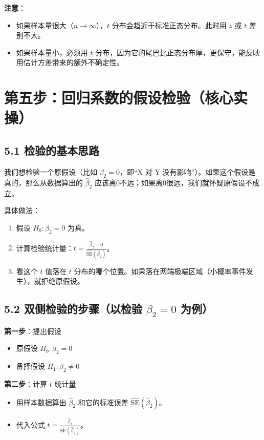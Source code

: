 \documentclass[12pt,a4paper]{ctexart}
\begin{document}
\textbf{注意}：
\begin{itemize}
    \item 如果样本量很大（\(n \to \infty\)），\(t\) 分布会趋近于标准正态分布。此时用 \(z\) 或 \(t\) 差别不大。
    \item 如果样本量小，必须用 \(t\) 分布，因为它的尾巴比正态分布厚，更保守，能反映用估计方差带来的额外不确定性。
\end{itemize}

\section*{第五步：回归系数的假设检验（核心实操）}

\subsection*{5.1 检验的基本思路}
我们想检验一个原假设（比如 \(\beta_2 = 0\)，即“X 对 Y 没有影响”）。如果这个假设是真的，那么从数据算出的 \(\hat{\beta}_2\) 应该离0不远；如果离0很远，我们就怀疑原假设不成立。

具体做法：
\begin{enumerate}
    \item 假设 \(H_0: \beta_2 = 0\) 为真。
    \item 计算检验统计量：\(t = \frac{\hat{\beta}_2 - 0}{\widehat{\text{SE}}(\hat{\beta}_2)}\)。
    \item 看这个 \(t\) 值落在 \(t\) 分布的哪个位置。如果落在两端极端区域（小概率事件发生），就拒绝原假设。
\end{enumerate}

\subsection*{5.2 双侧检验的步骤（以检验 \(\beta_2 = 0\) 为例）}
\textbf{第一步}：提出假设
\begin{itemize}
    \item 原假设 \(H_0: \beta_2 = 0\)
    \item 备择假设 \(H_1: \beta_2 \neq 0\)
\end{itemize}

\textbf{第二步}：计算 \(t\) 统计量
\begin{itemize}
    \item 用样本数据算出 \(\hat{\beta}_2\) 和它的标准误差 \(\widehat{\text{SE}}(\hat{\beta}_2)\)。
    \item 代入公式 \(t = \frac{\hat{\beta}_2}{\widehat{\text{SE}}(\hat{\beta}_2)}\)。
\end{itemize}
\end{document}
